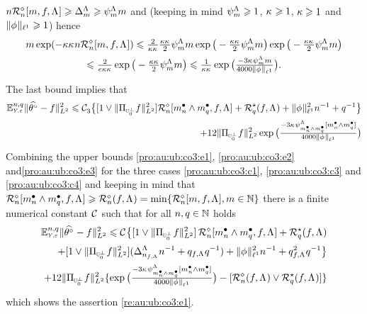 \begin{pro}
$\ssY\hRaDi{\Di,\xdf,\iSv}\geq\DipenSv\geq\cmiSv\Di$ and  (keeping
in mind $\cmiSv\geq1$, $\cpen\geq1$, $\rWc\geq1$ and
$\Vnormlp[1]{\fydf}\geq1$) hence
\begin{multline*}
\Di\exp(-\rWc\cpen\ssY\hRaDi{\Di,\xdf,\iSv})\leq
\tfrac{2}{\rWc\cpen}\tfrac{\rWc\cpen}{2}\cmiSv\Di\exp\big(-\tfrac{\rWc\cpen}{2}\cmiSv\Di\big)\exp\big(-\tfrac{\rWc\cpen}{2}\cmiSv\Di\big)\\
\leq\tfrac{2}{e\rWc\cpen}\exp\big(-\tfrac{\rWc\cpen}{2}\cmiSv\Di\big)\leq\tfrac{1}{\rWc\cpen}\exp\big(\tfrac{-3\cpen\cmiSv\Di}{4000\Vnormlp[1]{\fydf}}\big).
\end{multline*}
The last bound implies that
\begin{multline}\label{pro:au:ub:co3:e3}
\FuEx[\ssY,\ssE]{\rY,\rE}\VnormLp{\hxdfPr[]-\xdf}^2\leq\cst{3}\big\{[1\vee\VnormLp{\Proj[{\mHiH[0]^\perp}]\xdf}^2]\hRaDi{\sDi{\ssY}\wedge\sDi{\ssE},\xdf,\iSv}+\mRa{\xdf,\iSv}+\Vnormlp[1]{\fydf}^2\ssY^{-1}+\ssE^{-1}\big\}
\\
\hfill+12
\VnormLp{\Proj[{\mHiH[0]^\perp}]\xdf}^2\exp\big(\tfrac{-3\cpen\cmiSv[\sDi{\ssY}\wedge\sDi{\ssE}][\sDi{\ssY}\wedge\sDi{\ssE}]}{4000\Vnormlp[1]{\fydf}}\big)
  \end{multline}
Combining
the upper bounds \eqref{pro:au:ub:co3:e1}, \eqref{pro:au:ub:co3:e2} and\eqref{pro:au:ub:co3:e3}
for the three cases  \ref{pro:au:ub:co3:c1}, \ref{pro:au:ub:co3:c3} and
\ref{pro:au:ub:co3:c4} and keeping in mind that
$\hRaDi{\sDi{\ssY}\wedge\sDi{\ssE},\xdf,\iSv}\geq \hRa{\xdf,\iSv}=\min\{\hRaDi{\Di,\xdf,\iSv},\Di\in\Nz\}$ there is a finite numerical constant
$\cst{}$ such that for all $\ssY,\ssE\in\Nz$ holds
\begin{multline}\label{pro:au:ub:co3:e4}
\FuEx[\ssY,\ssE]{\rY,\rE}\VnormLp{\hxdfPr[]-\xdf}^2\leq
\cst{}\big\{[1\vee\VnormLp{\Proj[{\mHiH[0]^\perp}]\xdf}^2]\,\hRaDi{\sDi{\ssY}\wedge\sDi{\ssE},\xdf,\iSv}+\mRa{\xdf,\iSv}\\
\hfill+[1\vee\VnormLp{\Proj[{\mHiH[0]^\perp}]\xdf}^2](\DipenSv[\ssY_{\xdf,\iSv}]\ssY^{-1}+\ssE_{\xdf,\iSv}\ssE^{-1})+\Vnormlp[1]{\fydf}^2\ssY^{-1}+\ssE_{\xdf,\iSv}^2\ssE^{-1}\big\}
\\
\hfill+12
\VnormLp{\Proj[{\mHiH[0]^\perp}]\xdf}^2\{\exp\big(\tfrac{-3\cpen\cmiSv[\sDi{\ssY}\wedge\sDi{\ssE}][\sDi{\ssY}\wedge\sDi{\ssE}]}{4000\Vnormlp[1]{\fydf}}\big)-[\hRa{\xdf,\iSv}\vee\mRa{\xdf,\iSv}]\}
\end{multline}
which shows the assertion \eqref{re:au:ub:co3:e1}. 



\end{pro}
